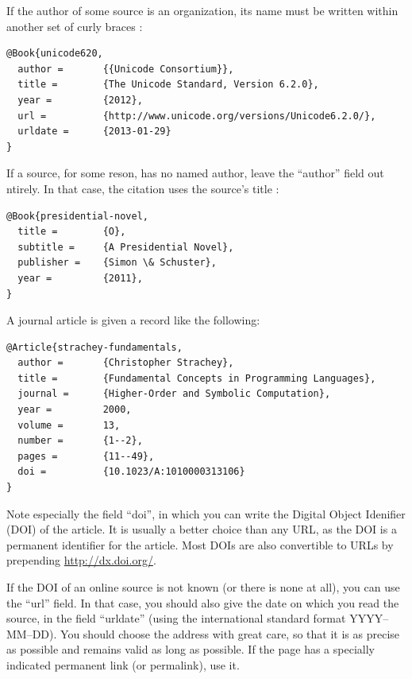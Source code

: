 \documentclass[utf8,english]{gradu3}
\begin{document}
If the author of some source is an organization, its name must be written
within another set of curly braces \parencite[eg.][]{unicode620}:

\begingroup\footnotesize
\begin{verbatim}
@Book{unicode620,
  author =       {{Unicode Consortium}},
  title =        {The Unicode Standard, Version 6.2.0},
  year =         {2012},
  url =          {http://www.unicode.org/versions/Unicode6.2.0/},
  urldate =      {2013-01-29}
}
\end{verbatim}
\endgroup

If a source, for some reson, has no named author, leave the ``author''
field out ntirely.  In that case, the citation uses the source's
title \parencite[eg.][]{presidential-novel}:

\begingroup\footnotesize
\begin{verbatim}
@Book{presidential-novel,
  title =        {O},
  subtitle =     {A Presidential Novel},
  publisher =    {Simon \& Schuster},
  year =         {2011},
}
\end{verbatim}
\endgroup

A journal article \parencite[eg.][]{strachey-fundamentals} is given a
record like the following:

\begingroup\footnotesize
\begin{verbatim}
@Article{strachey-fundamentals,
  author =       {Christopher Strachey},
  title =        {Fundamental Concepts in Programming Languages},
  journal =      {Higher-Order and Symbolic Computation},
  year =         2000,
  volume =       13,
  number =       {1--2},
  pages =        {11--49},
  doi =          {10.1023/A:1010000313106}
}
\end{verbatim}
\endgroup

Note especially the field ``doi'', in which you can write the Digital
Object Idenifier (DOI) of the article.  It is usually a better choice
than any URL, as the DOI is a permanent identifier for the article.
Most DOIs are also convertible to URLs by prepending
\url{http://dx.doi.org/}.

If the DOI of an online source is not known (or there is none at all),
you can use the ``url'' field.  In that case, you should also give the
date on which you read the source, in the field ``urldate'' (using the
international standard format YYYY--MM--DD).  You should choose the
address with great care, so that it is as precise as possible and
remains valid as long as possible.  If the page has a specially
indicated permanent link (or permalink), use it.
\end{document}

